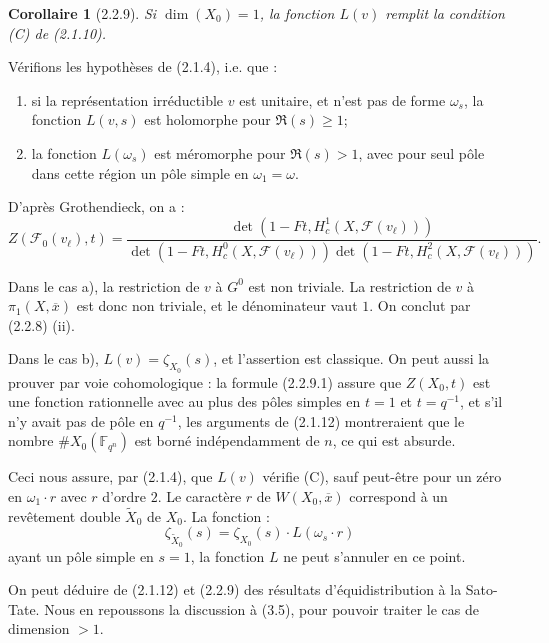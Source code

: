 \documentclass[12pt,a4paper]{article}
\theoremstyle{plain}
\newtheorem{corollary}[theorem]{Corollaire}
\theoremstyle{definition}
\theoremstyle{remark}
\newcommand{\FF}{{\mathbb{F}}}
\begin{document}
\begin{corollary}[2.2.9]
Si $\dim(X_0) = 1$, la fonction $L(v)$ remplit la condition (C) de (2.1.10).
\end{corollary}

V\'erifions les hypoth\`eses de (2.1.4), i.e. que :
\begin{enumerate}[label=\alph*)]
\item si la repr\'esentation irr\'eductible $v$ est unitaire, et n'est pas de forme $\omega_s$, la fonction $L(v,s)$ est holomorphe pour $\Re(s) \geq 1$;
\item la fonction $L(\omega_s)$ est m\'eromorphe pour $\Re(s) > 1$, avec pour seul p\^ole dans cette r\'egion un p\^ole simple en $\omega_1 = \omega$.
\end{enumerate}

D'apr\`es Grothendieck, on a :
\begin{equation}\label{eq:2.2.9.1}
Z(\mathscr{F}_0(v_\ell), t) = \frac{\det(1 - Ft, H_c^1(X, \mathscr{F}(v_\ell)))}{\det(1 - Ft, H_c^0(X, \mathscr{F}(v_\ell))) \det(1 - Ft, H_c^2(X, \mathscr{F}(v_\ell)))}.
\end{equation}

Dans le cas a), la restriction de $v$ \`a $G^0$ est non triviale. La restriction de $v$ \`a $\pi_1(X, \overline{x})$ est donc non triviale, et le d\'enominateur vaut $1$. On conclut par (2.2.8) (ii).

Dans le cas b), $L(v) = \zeta_{X_0}(s)$, et l'assertion est classique. On peut aussi la prouver par voie cohomologique : la formule (2.2.9.1) assure que $Z(X_0, t)$ est une fonction rationnelle avec au plus des p\^oles simples en $t = 1$ et $t = q^{-1}$, et s'il n'y avait pas de p\^ole en $q^{-1}$, les arguments de (2.1.12) montreraient que le nombre $\#X_0(\FF_{q^n})$ est born\'e ind\'ependamment de $n$, ce qui est absurde.

Ceci nous assure, par (2.1.4), que $L(v)$ v\'erifie (C), sauf peut-\^etre pour un z\'ero en $\omega_1 \cdot r$ avec $r$ d'ordre $2$. Le caract\`ere $r$ de $W(X_0, \overline{x})$ correspond \`a un rev\^etement double $\widetilde{X}_0$ de $X_0$. La fonction :
\[ \zeta_{\widetilde{X}_0}(s) = \zeta_{X_0}(s) \cdot L(\omega_s \cdot r) \]
ayant un p\^ole simple en $s = 1$, la fonction $L$ ne peut s'annuler en ce point.

On peut d\'eduire de (2.1.12) et (2.2.9) des r\'esultats d'\'equidistribution \`a la Sato-Tate. Nous en repoussons la discussion \`a (3.5), pour pouvoir traiter le cas de dimension $> 1$.
\end{document}
